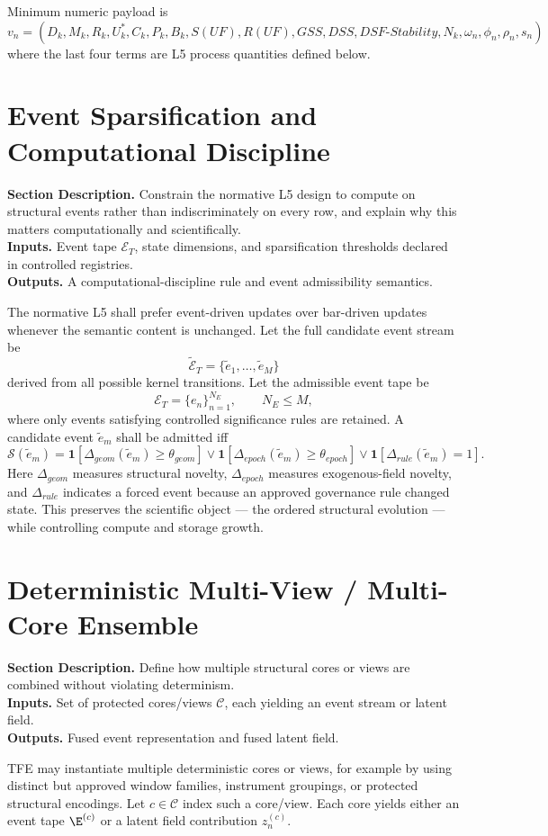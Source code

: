 \documentclass[11pt]{report}
\newcommand{\meta}[3]{\textbf{Section Description.} #1\\
\textbf{Inputs.} #2\\
\textbf{Outputs.} #3\par}
\begin{document}
Minimum numeric payload is
\[
v_n = (D_k,M_k,R_k,U_k^{\ast},C_k,P_k,B_k,S(UF),R(UF),GSS,DSS,DSF\text{-}Stability,N_k,\omega_n,\phi_n,\rho_n,s_n)
\]
where the last four terms are L5 process quantities defined below.


\section{Event Sparsification and Computational Discipline}
\meta{Constrain the normative L5 design to compute on structural events rather than indiscriminately on every row, and explain why this matters computationally and scientifically.}{Event tape $\mathcal{E}_T$, state dimensions, and sparsification thresholds declared in controlled registries.}{A computational-discipline rule and event admissibility semantics.}

The normative L5 shall prefer event-driven updates over bar-driven updates whenever the semantic content is unchanged. Let the full candidate event stream be
\[
\widetilde{\mathcal{E}}_T = \{\tilde e_1,\dots,\tilde e_M\}
\]
derived from all possible kernel transitions. Let the admissible event tape be
\[
\mathcal{E}_T = \{e_n\}_{n=1}^{N_E},\qquad N_E\le M,
\]
where only events satisfying controlled significance rules are retained. A candidate event $\tilde e_m$ shall be admitted iff
\[
\mathcal{S}(\tilde e_m)=\mathbf{1}[\Delta_{geom}(\tilde e_m)\ge \theta_{geom}]\vee \mathbf{1}[\Delta_{epoch}(\tilde e_m)\ge \theta_{epoch}]\vee \mathbf{1}[\Delta_{rule}(\tilde e_m)=1].
\]
Here $\Delta_{geom}$ measures structural novelty, $\Delta_{epoch}$ measures exogenous-field novelty, and $\Delta_{rule}$ indicates a forced event because an approved governance rule changed state. This preserves the scientific object --- the ordered structural evolution --- while controlling compute and storage growth.

\section{Deterministic Multi-View / Multi-Core Ensemble}
\meta{Define how multiple structural cores or views are combined without violating determinism.}{Set of protected cores/views $\mathcal{C}$, each yielding an event stream or latent field.}{Fused event representation and fused latent field.}

TFE may instantiate multiple deterministic cores or views, for example by using distinct but approved window families, instrument groupings, or protected structural encodings. Let $c\in\mathcal{C}$ index such a core/view. Each core yields either an event tape $\E^{(c)}$ or a latent field contribution $z_n^{(c)}$.
\end{document}
